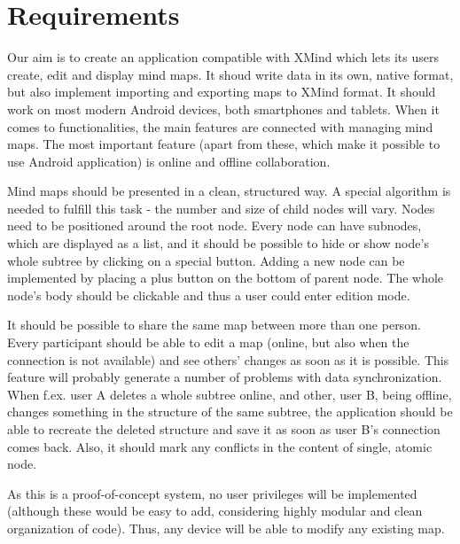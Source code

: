 %
%
%
%
%

\section{Requirements}
\label{sec:requirements}

Our aim is to create an application compatible with XMind which lets its users create, edit and display mind maps. It shoud write data in its own, native format, but also implement importing and exporting maps to XMind format. It should work on most modern Android devices, both smartphones and tablets. When it comes to functionalities, the main features are connected with managing mind maps. The most important feature (apart from these, which make it possible to use Android application) is online and offline collaboration. 

Mind maps should be presented in a clean, structured way. A special algorithm is needed to fulfill this task - the number and size of child nodes will vary. Nodes need to be positioned around the root node. Every node can have subnodes, which are displayed as a list, and it should be possible to hide or show node's whole subtree by clicking on a special button. Adding a new node can be implemented by placing a plus button on the bottom of parent node. The whole node's body should be clickable and thus a user could enter edition mode.

It should be possible to share the same map between more than one person. Every participant should be able to edit a map (online, but also when the connection is not available) and see others' changes as soon as it is possible. This feature will probably generate a number of problems with data synchronization. When f.ex. user A deletes a whole subtree online, and other, user B, being offline, changes something in the structure of the same subtree, the application should be able to recreate the deleted structure and save it as soon as user B's connection comes back. Also, it should mark any conflicts in the content of single, atomic node. 

As this is a proof-of-concept system, no user privileges will be implemented (although these would be easy to add, considering highly modular and clean organization of code). Thus, any device will be able to modify any existing map.
